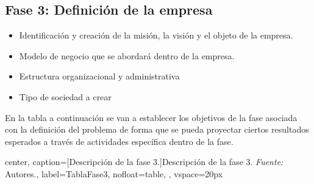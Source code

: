 {}
\subsection*{Fase 3: Definición de la empresa}


\begin{itemize}
	\item Identificación y creación de la misión, la visión y el objeto de la empresa.
	
	\item Modelo de negocio que se abordará dentro de la empresa.
	
	\item Estructura organizacional y administrativa
	
	\item Tipo de sociedad a crear
\end{itemize}

En la tabla a continuación se van a establecer los objetivos de la fase asociada con la definición del problema de forma que se pueda proyectar ciertos resultados esperados a través de actividades específica dentro de la fase.

\begin{adjustbox}{
		center,
		caption=[{Descripción de la fase 3.}]{\centering Descripción de la fase 3. \textit{Fuente:} Autores.},
		label={TablaFase3},
		nofloat=table, , vspace={20px}}
	
\end{adjustbox}
